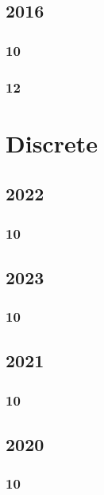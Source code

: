 \documentclass[11pt]{book}
\begin{document}
\section{2016}
\subsection{10}

\subsection{12}


%
%
%

\chapter{Discrete}
\section{2022}
\subsection{10}

\section{2023}
\subsection{10}

\section{2021}
\subsection{10}

\section{2020}
\subsection{10}

\end{document}

